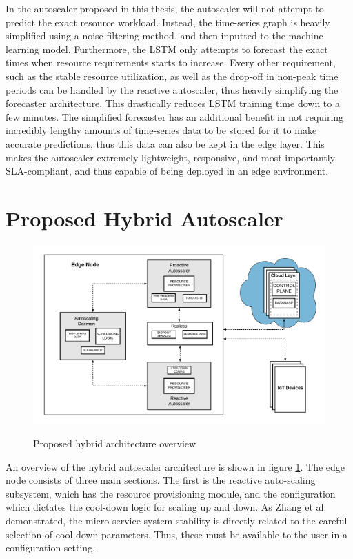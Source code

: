 In the autoscaler proposed in this thesis, the autoscaler will not attempt to predict the exact resource workload. Instead, the time-series graph is heavily simplified using a noise filtering method, and then inputted to the machine learning model. Furthermore, the LSTM only attempts to forecast the exact times when resource requirements starts to increase. Every other requirement, such as the stable resource utilization, as well as the drop-off in non-peak time periods can be handled by the reactive autoscaler, thus heavily simplifying the forecaster architecture. This drastically reduces LSTM training time down to a few minutes. The simplified forecaster has an additional benefit in not requiring incredibly lengthy amounts of time-series data to be stored for it to make accurate predictions, thus this data can also be kept in the edge layer. This makes the autoscaler extremely lightweight, responsive, and most importantly SLA-compliant, and thus capable of being deployed in an edge environment.\par

\section{Proposed Hybrid Autoscaler}
\label{sec:ch3-hybrid-autoscale-overview} 

\begin{figure}[htb]
    \centering
    \caption{Proposed hybrid architecture overview}
    \includegraphics[width=1.0\linewidth]{Figures/Hybrid-Architecture-Overview.pdf}
    \label{fig:hybrid-arch-overview}
\end{figure}

An overview of the hybrid autoscaler architecture is shown in figure \ref{fig:hybrid-arch-overview}. The edge node consists of three main sections. The first is the reactive auto-scaling subsystem, which has the resource provisioning module, and the configuration which dictates the cool-down logic for scaling up and down. As Zhang et al. \cite{zhang2019quantifying} demonstrated, the micro-service system stability is directly related to the careful selection of cool-down parameters. Thus, these must be available to the user in a configuration setting.\par

